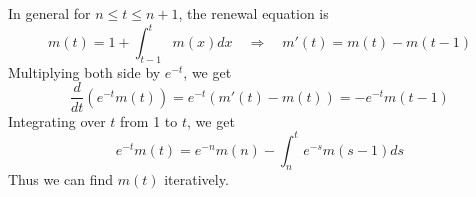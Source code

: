 \documentclass[letterpaper,handout, mathserif]{beamer}
\begin{document}
\begin{frame}
In general for $n\le t\le n+1$, the renewal equation is
$$m(t) = 1 + \int_{t-1}^t m(x)dx\quad\Rightarrow\quad m'(t)= m(t)-m(t-1)$$
Multiplying both side by $e^{-t}$, we get
$$\frac{d}{dt}(e^{-t}m(t))=e^{-t}(m'(t)-m(t))=-e^{-t}m(t-1)$$
Integrating over $t$ from 1 to $t$, we get
$$e^{-t}m(t)=e^{-n}m(n)- \int_n^t e^{-s}m(s-1)ds$$
Thus we can find $m(t)$ iteratively.
\end{frame}
\end{document}
